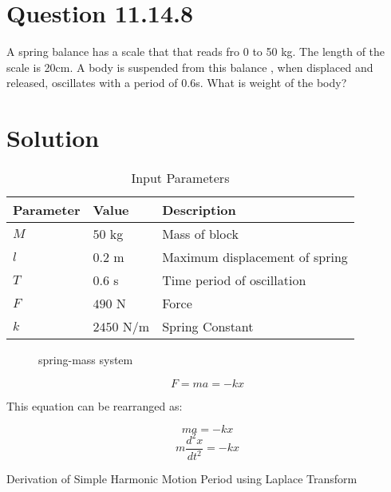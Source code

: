 \documentclass[journal,12pt,twocolumn]{IEEEtran}
\theoremstyle{remark}
\begin{document}
\section{Question 11.14.8}A spring balance has a scale that that reads fro 0 to 50 kg. The length of the scale is 20cm. A body is suspended from this balance , when displaced and released, oscillates with a period of 0.6s. What is weight of the body? 

\section{Solution}
\fi
\begin{table}[htbp]
    \centering
    \caption{Input Parameters}
    \label{tab:parak}
	\begin{tabular}{|p{1.2cm}|p{1cm}|p{4cm}|}
        \hline
        \textbf{Parameter} & \textbf{Value} & \textbf{Description} \\
        \hline
        $M$ & $50$ kg & Mass of block \\
        \hline
        $l$ & $0.2$ m & Maximum displacement of spring \\
        \hline
	$T$ & $0.6$ s & Time period of oscillation \\
        \hline
	$F$ & $490$ N & Force \\
        \hline
	$k$ & $2450$ N/m & Spring Constant \\
        \hline
    \end{tabular}
\end{table}

\begin{figure}[!h]
    \centering
        \resizebox{0.6\columnwidth}{!}{%
        }
    \caption{ spring-mass system}
    \label{fig:another-spring-mass-system}
\end{figure}

\begin{equation} 
	F = ma = -kx
\end{equation}

This equation can be rearranged as:

\begin{equation}
	ma = -kx 
\end{equation}
\begin{equation}
	m\frac{d^2x}{dt^2} = -kx 
\end{equation}


Derivation of Simple Harmonic Motion Period using Laplace Transform
\end{document}
